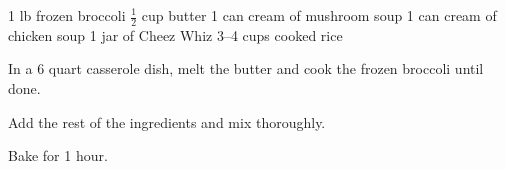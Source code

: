 \dishtype{\main}
\dishother{\vegetarian}
\begin{ingreds}
    1 lb frozen broccoli
    $\frac{1}{2}$ cup butter
    1 can cream of mushroom soup
    1 can cream of chicken soup
    1 jar of Cheez Whiz\textsuperscript{\textregistered}
    3--4 cups cooked rice
\end{ingreds}
\begin{method}
    In a 6 quart casserole dish, melt the butter and cook the frozen broccoli until done.\par
    Add the rest of the ingredients and mix thoroughly.\par
    Bake for 1 hour.
\end{method}